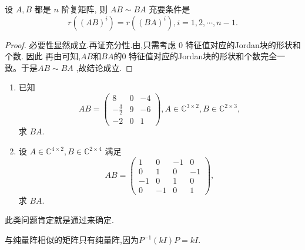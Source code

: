 \documentclass[../../main.tex]{subfiles}
\begin{document}
\begin{corollary}
设 \( A,B \) 都是 \( n \) 阶复矩阵, 则 \( AB \sim BA \) 充要条件是
\[
r\left( (AB)^i \right) = r\left( (BA)^i \right), i = 1,2,\cdots, n - 1.
\]
\end{corollary}
\begin{proof}
必要性显然成立.再证充分性.由,只需考虑 0 特征值对应的Jordan块的形状和个数. 因此 再由可知,$AB$和$BA$的0 特征值对应的Jordan块的形状和个数完全一致。于是\( AB \sim BA \) ,故结论成立.
\end{proof}

\begin{example}
\begin{enumerate}
\item 已知
\[
AB = \begin{pmatrix}
8 & 0 & -4 \\
-\frac{3}{2} & 9 & -6 \\
-2 & 0 & 1
\end{pmatrix}, A \in \mathbb{C}^{3 \times 2}, B \in \mathbb{C}^{2 \times 3},
\]
求 \( BA \).

\item 设 \( A \in \mathbb{C}^{4 \times 2}, B \in \mathbb{C}^{2 \times 4} \) 满足
\[
AB = \begin{pmatrix}
1 & 0 & -1 & 0 \\
0 & 1 & 0 & -1 \\
-1 & 0 & 1 & 0 \\
0 & -1 & 0 & 1
\end{pmatrix},
\]
求 \( BA \).
\end{enumerate}
\end{example}
\begin{note}
此类问题肯定就是通过来确定.
\end{note}
\begin{remark}
与纯量阵相似的矩阵只有纯量阵,因为$P^{-1}(kI)P=kI$.
\end{remark}
\end{document}
